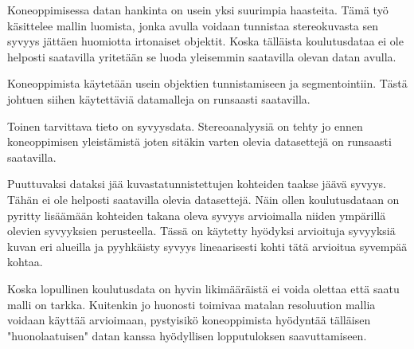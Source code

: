 
Koneoppimisessa datan hankinta on usein yksi suurimpia haasteita. 
Tämä työ käsittelee mallin luomista, jonka avulla voidaan tunnistaa stereokuvasta sen syvyys jättäen huomiotta irtonaiset objektit.
Koska tälläista koulutusdataa ei ole helposti saatavilla yritetään se luoda yleisemmin saatavilla olevan datan avulla. 

Koneoppimista käytetään usein objektien tunnistamiseen ja segmentointiin. Tästä johtuen siihen käytettäviä datamalleja on runsaasti saatavilla.

Toinen tarvittava tieto on syvyysdata. 
Stereoanalyysiä on tehty jo ennen koneoppimisen yleistämistä joten sitäkin varten olevia datasettejä on runsaasti saatavilla. 

Puuttuvaksi dataksi jää kuvastatunnistettujen kohteiden taakse jäävä syvyys. Tähän ei ole helposti saatavilla olevia datasettejä.
Näin ollen koulutusdataan on pyritty lisäämään kohteiden takana oleva syvyys arvioimalla niiden ympärillä olevien syvyyksien perusteella.
Tässä on käytetty hyödyksi arvioituja syvyyksiä kuvan eri alueilla ja pyyhkäisty syvyys lineaarisesti kohti tätä arvioitua syvempää kohtaa.

Koska lopullinen koulutusdata on hyvin likimääräistä ei voida olettaa että saatu malli on tarkka.
Kuitenkin jo huonosti toimivaa matalan resoluution mallia voidaan käyttää arvioimaan,
pystyisikö koneoppimista hyödyntää tälläisen "huonolaatuisen" datan kanssa hyödyllisen lopputuloksen saavuttamiseen.